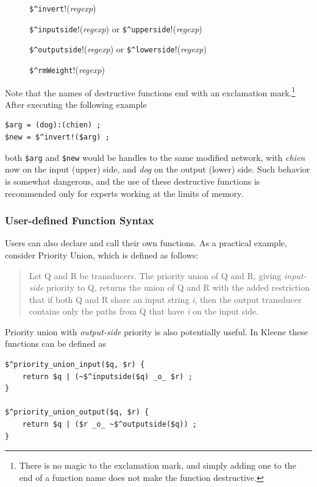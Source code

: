 \documentclass[letterpaper,12pt]{article}
\newcommand{\Kleene}{Kleene\xspace}
\begin{document}
\begin{description}
\item[]
\verb!$^invert!!(\emph{regexp})
\item[]
\verb!$^inputside!!(\emph{regexp}) or \verb!$^upperside!!(\emph{regexp}) 
\item[]
\verb!$^outputside!!(\emph{regexp}) or \verb!$^lowerside!!(\emph{regexp}) 
\item[]
\verb!$^rmWeight!!(\emph{regexp})
\end{description}

\noindent
Note that the names of destructive functions end with an
exclamation mark.\footnote{There is no magic to the exclamation mark,
and simply adding one to the end of a function name does not make the function
destructive.}  After executing the following example

\begin{Verbatim}[fontsize=\small]
$arg = (dog):(chien) ;
$new = $^invert!($arg) ;
\end{Verbatim}

\noindent
both \verb!$arg! and \verb!$new! would be handles to the same
modified network, with \emph{chien} now on the input (upper) side, and \emph{dog} on
the output (lower) side.  Such behavior is somewhat dangerous, and the use of these
destructive functions is recommended only for experts working at the limits
of memory.

\subsubsection{User-defined Function Syntax}

Users can also declare and call their own functions.  As a practical
example, consider Priority Union, which is defined as follows:

\begin{quotation}
Let Q and R be transducers.  The priority union of Q and
R, giving \emph{input-side} priority to Q, returns the union of Q and R
with the added 
restriction that if both Q and R share an input string \emph{i}, then
the output transducer contains only the paths from Q that have
\emph{i} on the
input side.
\end{quotation}

\noindent
Priority union with \emph{output-side} priority is also potentially useful.
In \Kleene{} these functions can be defined as

\begin{Verbatim}[fontsize=\small]
$^priority_union_input($q, $r) {
	return $q | (~$^inputside($q) _o_ $r) ;
}

$^priority_union_output($q, $r) {
	return $q | ($r _o_ ~$^outputside($q)) ;
}
\end{Verbatim}
\end{document}
